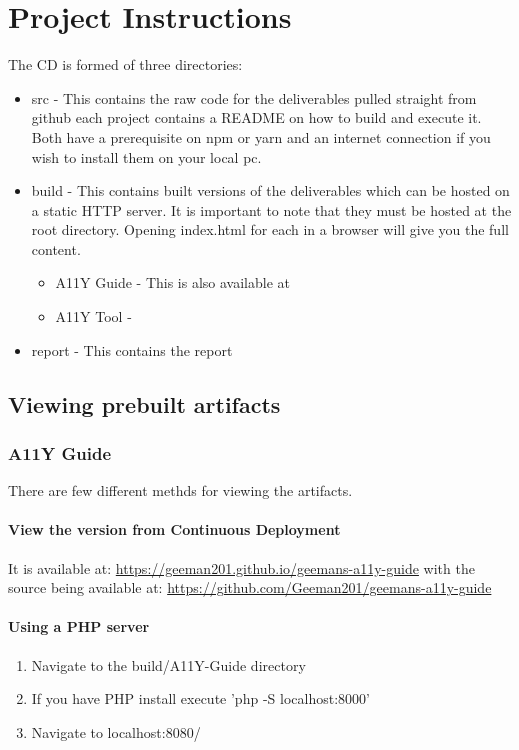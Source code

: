\chapter{Project Instructions}
\label{AppendixA}

The CD is formed of three directories:
\begin{itemize}
\item src - This contains the raw code for the deliverables pulled straight
from github each project contains a README on how to build and execute it.
Both have a prerequisite on npm or yarn and an internet connection if you
wish to install them on your local pc.
\item build - This contains built versions of the deliverables which can be
hosted on a static HTTP server. It is important to note that they must be
hosted at the root directory. Opening index.html for each in a browser will
give you the full content.
 \begin{itemize}
  \item A11Y Guide - This is also available at
  \item A11Y Tool -
 \end{itemize}
\item report - This contains the report
\end{itemize}

\section{Viewing prebuilt artifacts}
\subsection{A11Y Guide}
There are few different methds for viewing the artifacts.

\subsubsection{View the version from Continuous Deployment}
It is available at: \url{https://geeman201.github.io/geemans-a11y-guide}
with the source being available at: \url{https://github.com/Geeman201/geemans-a11y-guide}

\subsubsection{Using a PHP server}
\begin{enumerate}
\item Navigate to the build/A11Y-Guide directory
\item If you have PHP install execute 'php -S localhost:8000'
\item Navigate to localhost:8080/
\end{enumerate}

